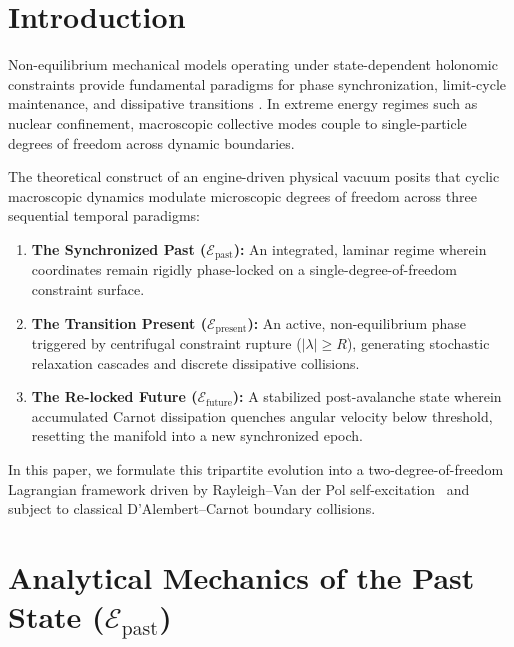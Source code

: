 \documentclass[aps,prc,twocolumn,superscriptaddress,amsmath,amssymb,nofootinbib]{revtex4-2}
\begin{document}
\maketitle

\section{Introduction}
Non-equilibrium mechanical models operating under state-dependent holonomic constraints provide fundamental paradigms for phase synchronization, limit-cycle maintenance, and dissipative transitions \cite{Dao1985,Goldstein2001,Brogliato1999}. In extreme energy regimes such as nuclear confinement, macroscopic collective modes couple to single-particle degrees of freedom across dynamic boundaries. 

The theoretical construct of an engine-driven physical vacuum posits that cyclic macroscopic dynamics modulate microscopic degrees of freedom across three sequential temporal paradigms:
\begin{enumerate}
    \item \textbf{The Synchronized Past (\(\mathcal{E}_{\text{past}}\)):} An integrated, laminar regime wherein coordinates remain rigidly phase-locked on a single-degree-of-freedom constraint surface.
    \item \textbf{The Transition Present (\(\mathcal{E}_{\text{present}}\)):} An active, non-equilibrium phase triggered by centrifugal constraint rupture (\(|\lambda| \ge R\)), generating stochastic relaxation cascades and discrete dissipative collisions.
    \item \textbf{The Re-locked Future (\(\mathcal{E}_{\text{future}}\)):} A stabilized post-avalanche state wherein accumulated Carnot dissipation quenches angular velocity below threshold, resetting the manifold into a new synchronized epoch.
\end{enumerate}

In this paper, we formulate this tripartite evolution into a two-degree-of-freedom Lagrangian framework driven by Rayleigh--Van der Pol self-excitation~\cite{VanDerPol1926} and subject to classical D'Alembert--Carnot boundary collisions.

\section{Analytical Mechanics of the Past State (\(\mathcal{E}_{\text{past}}\))}
\end{document}

